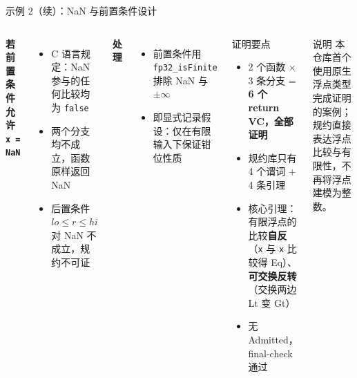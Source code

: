 \documentclass[UTF8,aspectratio=169]{ctexbeamer}
\begin{document}
\begin{frame}{示例 2（续）：NaN 与前置条件设计}
  \begin{columns}[T]
    \textbf{若前置条件允许 \texttt{x = NaN}}
    \begin{itemize}\small
      \item C 语言规定：NaN 参与的任何比较均为 \texttt{false}
      \item 两个分支均不成立，函数原样返回 NaN
      \item 后置条件 $\mathit{lo} \le r \le \mathit{hi}$ 对 NaN 不成立，规约不可证
    \end{itemize}
    \textbf{处理}
    \begin{itemize}\small
      \item 前置条件用 \texttt{fp32\_isFinite} 排除 NaN 与 $\pm\infty$
      \item 即显式记录假设：仅在有限输入下保证钳位性质
    \end{itemize}
    \begin{block}{证明要点}
      \small
      \begin{itemize}
        \item 2 个函数 $\times$ 3 条分支 = \textbf{6 个 return VC，全部证明}
        \item 规约库只有 4 个谓词 + 4 条引理
        \item 核心引理：有限浮点的比较\textbf{自反}（\texttt{x} 与 \texttt{x} 比较得 Eq）、\textbf{可交换反转}（交换两边 Lt 变 Gt）
        \item 无 Admitted，final-check 通过
      \end{itemize}
    \end{block}
    \begin{block}{说明}
      \small 本仓库首个使用原生浮点类型完成证明的案例；规约直接表达浮点比较与有限性，不再将浮点建模为整数。
    \end{block}
  \end{columns}
\end{frame}
\end{document}
